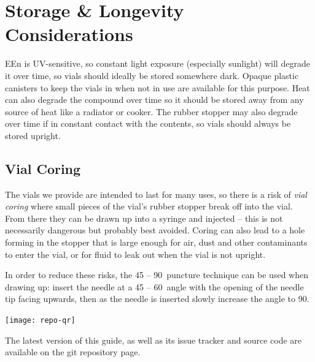 \documentclass[twoside,a5paper]{article}
\begin{document}
\section{Storage \& Longevity Considerations}

EEn is UV-sensitive, so constant light exposure (especially sunlight)
will degrade it over time, so vials should ideally be stored somewhere
dark.  Opaque plastic canisters to keep the vials in when not in use
are available for this purpose.  Heat can also degrade the compound
over time so it should be stored away from any source of heat like a
radiator or cooker.  The rubber stopper may also degrade over time if
in constant contact with the contents, so vials should always be
stored upright.

\subsection{Vial Coring}

The vials we provide are intended to last for many uses, so there is a
risk of \textit{vial coring} where small pieces of the vial's rubber
stopper break off into the vial.  From there they can be drawn up into
a syringe and injected -- this is not necessarily dangerous but
probably best avoided.  Coring can also lead to a hole forming in the
stopper that is large enough for air, dust and other contaminants to
enter the vial, or for fluid to leak out when the vial is not upright.

In order to reduce these risks, the 45 -- 90\textdegree\ puncture
technique can be used when drawing up: insert the needle at a 45 --
60\textdegree\ angle with the opening of the needle tip facing
upwards, then as the needle is inserted slowly increase the angle to
90\textdegree.

\cleardoublepage

\pagestyle{empty}
\begin{center}
  \null\vfill
  \texttt{[image: repo-qr]} \\
  \vspace{1.2em}
  \parbox{0.8\textwidth}{
    \small
    The latest version of this guide, as well as its issue tracker and
    source code are available on the git repository page.
  }
  \vfill
\end{center}
\end{document}

